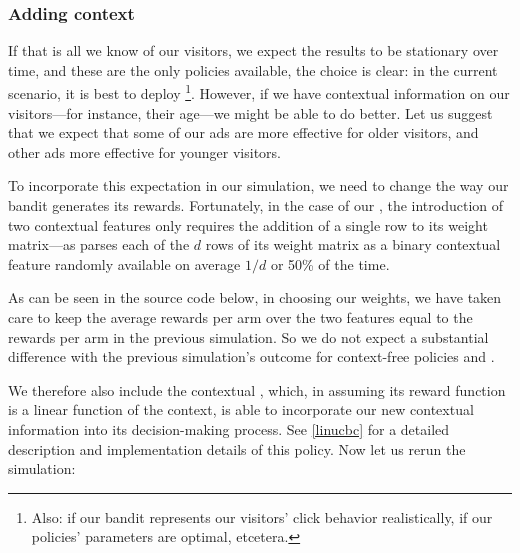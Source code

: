 \documentclass{jss}
\begin{document}
\subsubsection{Adding context}

If that is all we know of our visitors, we expect the results to be stationary over time, and these are the only policies available, the choice is clear: in the current scenario, it is best to deploy \footnote{Also: if our bandit represents our visitors' click behavior realistically, if our policies' parameters are optimal, etcetera.}. However, if we have contextual information on our visitors---for instance, their age---we might be able to do better. Let us suggest that we expect that some of our ads are more effective for older visitors, and other ads more effective for younger visitors.

To incorporate this expectation in our simulation, we need to change the way our bandit generates its rewards. Fortunately, in the case of our , the introduction of two contextual features only requires the addition of a single row to its weight matrix---as  parses each of the $d$ rows of its weight matrix as a binary contextual feature randomly available on average $1/d$ or 50\% of the time.

As can be seen in the source code below, in choosing our weights, we have taken care to keep the average rewards per arm over the two features equal to the rewards per arm in the previous simulation. So we do not expect a substantial difference with the previous simulation's outcome for context-free policies  and .

We therefore also include the contextual  \citep{Li2010}, which, in assuming its reward function is a linear function of the context, is able to incorporate our new contextual information into its decision-making process. See \ref{linucbc} for a detailed description and implementation details of this policy. Now let us rerun the simulation:
\end{document}

